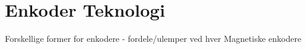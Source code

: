 \section{Enkoder Teknologi}
\label{sec:enkodertek}
Forskellige former for enkodere
- fordele/ulemper ved hver
Magnetiske enkodere
